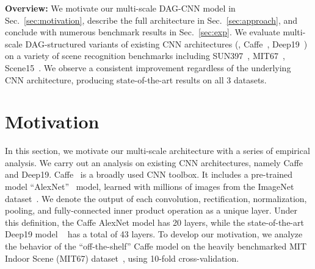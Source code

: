 \documentclass[10pt,twocolumn,letterpaper]{article}
\begin{document}
{\bf Overview:} We motivate our multi-scale DAG-CNN model in Sec.~\ref{sec:motivation}, describe the full architecture in Sec.~\ref{sec:approach}, and conclude with numerous benchmark results in Sec.~\ref{sec:exp}. We evaluate multi-scale DAG-structured variants of existing CNN architectures (\eg, Caffe~\cite{Caffe}, Deep19~\cite{veryDeep}) on a variety of scene recognition benchmarks including SUN397~\cite{SUN397}, MIT67~\cite{MIT67}, Scene15~\cite{Scene15}. We observe a consistent improvement regardless of the underlying CNN architecture, producing state-of-the-art results on all 3 datasets.



\section{Motivation\label{sec:motivation}}

In this section, we motivate our multi-scale architecture with a series of empirical analysis. We carry out an analysis on existing CNN architectures, namely Caffe and Deep19. Caffe~\cite{Caffe} is a broadly used CNN toolbox. It includes a pre-trained model ``AlexNet''~\cite{AlexNet} model, learned with millions of images from the ImageNet dataset~\cite{ImageNet}. We denote the output of each convolution, rectification, normalization, pooling, and fully-connected inner product operation as a unique layer. Under this definition, the Caffe AlexNet model has 20 layers, while the state-of-the-art Deep19 model ~\cite{veryDeep} has a total of 43 layers.
To develop our motivation, we analyze the behavior of the ``off-the-shelf'' Caffe model on the heavily benchmarked MIT Indoor Scene (MIT67) dataset~\cite{MIT67}, using 10-fold cross-validation.
\end{document}
